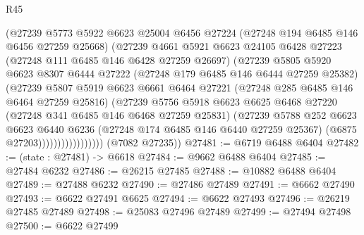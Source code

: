\begin{lexlean}{R45}
\begin{coremodule}
{                          (@27239
                            @5773
                            @5922
                            @6623
                            @25004
                            @6456
                            @27224
                            (@27248 @194 @6485 @146 @6456 @27259 @25668)
                            (@27239
                              @4661
                              @5921
                              @6623
                              @24105
                              @6428
                              @27223
                              (@27248 @111 @6485 @146 @6428 @27259 @26697)
                              (@27239
                                @5805
                                @5920
                                @6623
                                @8307
                                @6444
                                @27222
                                (@27248 @179 @6485 @146 @6444 @27259 @25382)
                                (@27239
                                  @5807
                                  @5919
                                  @6623
                                  @6661
                                  @6464
                                  @27221
                                  (@27248 @285 @6485 @146 @6464 @27259 @25816)
                                  (@27239
                                    @5756
                                    @5918
                                    @6623
                                    @6625
                                    @6468
                                    @27220
                                    (@27248 @341 @6485 @146 @6468 @27259 @25831)
                                    (@27239
                                      @5788
                                      @252
                                      @6623
                                      @6623
                                      @6440
                                      @6236
                                      (@27248 @174 @6485 @146 @6440 @27259 @25367)
                                      (@6875 @27203)))))))))))))))))
      (@7082 @27235))
@27481 := @6719 @6488 @6404
@27482 := (state : @27481) -> @6618
@27484 := @9662 @6488 @6404
@27485 := @27484 @6232
@27486 := @26215 @27485
@27488 := @10882 @6488 @6404
@27489 := @27488 @6232
@27490 := @27486 @27489
@27491 := @6662 @27490
@27493 := @6622 @27491 @6625
@27494 := @6622 @27493
@27496 := @26219 @27485 @27489
@27498 := @25083 @27496 @27489
@27499 := @27494 @27498
@27500 := @6622 @27499
}
\end{coremodule}
\end{lexlean}
